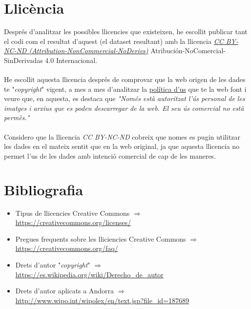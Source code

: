 \documentclass[10pt,a4paper]{article}
\begin{document}
\section{Llicència}

Després d'analitzar les possibles llicencies que existeixen, he escollit publicar tant el codi com el resultat d'aquest (el dataset resultant) amb la llicencia \textit{\href{https://creativecommons.org/licenses/by-nc-nd/4.0/deed.es}{CC BY-NC-ND (Attribution-NonCommercial-NoDerivs)}} Atribución-NoComercial-SinDerivadas 4.0 Internacional.

\paragraph*{}
He escollit aquesta llicencia després de comprovar que la web origen de les dades te "\textit{copyright}" vigent, a mes a mes d'analitzar la \href{https://www.mediambient.ad/avis-legal}{política d'us} que te la web font i veure que, en aquesta, es destaca que \textit{"Només està autoritzat l'ús personal de les imatges i arxius que es poden descarregar de la web. El seu ús comercial no està permès."}

\paragraph*{}
Considero que la llicencia \textit{CC BY-NC-ND} cobreix que nomes es pugin utilitzar les dades en el mateix sentit que en la web original, ja que aquesta llicencia no permet l'us de les dades amb intenció comercial de cap de les maneres.

\section*{Bibliografia}
\begin{itemize} \label{bibliography:1}
\item Tipus de llicencies Creative Commons $\Rightarrow$ \href{https://creativecommons.org/licenses/}{https://creativecommons.org/licenses/}
\item Pregues frequents sobre les lliciencies Creative Commons $\Rightarrow$ \href{https://creativecommons.org/faq/}{https://creativecommons.org/faq/}
\item Drets d'autor "\textit{copyright}" $\Rightarrow$ \href{https://es.wikipedia.org/wiki/Derecho_de_autor}{https://es.wikipedia.org/wiki/Derecho\_de\_autor}
\item Drets d'autor aplicats a Andorra $\Rightarrow$ \href{http://www.wipo.int/wipolex/en/text.jsp?file_id=187689}{http://www.wipo.int/wipolex/en/text.jsp?file\_id=187689}
\end{itemize}
\end{document}
